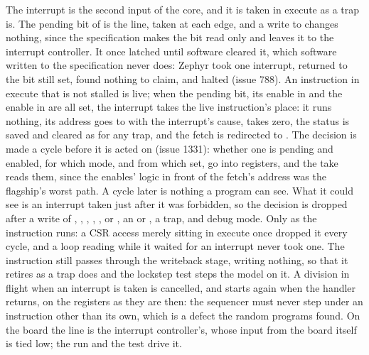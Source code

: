 \documentclass[journal,onecolumn,9pt]{IEEEtran}
\begin{document}
The interrupt is the second input of the core, and it is taken in
execute as a trap is. The pending bit of  is the line,
taken at each edge, and a write to  changes nothing, since
the specification makes the bit read only and leaves it to the
interrupt controller. It once latched until software cleared it, which
software written to the specification never does: Zephyr took one
interrupt, returned to the bit still set, found nothing to claim, and
halted (issue 788). An instruction in execute that is not
stalled is live; when the pending bit, its enable in  and
the enable in  are all set, the interrupt takes the
live instruction's place: it runs nothing, its address goes to
 with the interrupt's cause,  takes zero,
the status is saved and cleared as for any trap, and the fetch is
redirected to . The decision is made a cycle before it is
acted on (issue 1331): whether one is pending and enabled, for which
mode, and from which set, go into registers, and the take reads them,
since the enables' logic in front of the fetch's address was the
flagship's worst path. A cycle later is nothing a program can see.
What it could see is an interrupt taken just after it was forbidden,
so the decision is dropped after a write of ,
, , , ,  or
, an  or , a trap, and debug mode.
Only as the instruction runs: a CSR access merely sitting in execute
once dropped it every cycle, and a loop reading  while it
waited for an interrupt never took one. The instruction still passes through
the writeback stage, writing nothing, so that it retires as a trap
does and the lockstep test steps the model on it. A division in
flight when an interrupt is taken is cancelled, and starts again
when the handler returns, on the registers as they are then: the
sequencer must never step under an instruction other than its own,
which is a defect the random programs found. On the board the line is the
interrupt controller's, whose input from the board itself is tied
low; the run and the test drive it.
\end{document}
